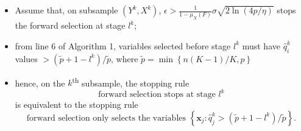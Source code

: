 \documentclass[11pt,review,authoryear]{elsarticle}
\begin{document}
\begin{appendices}
\begin{itemize}
  \item Assume that, on subsample $\left(Y^{k},X^{k}\right)$, $\epsilon>\frac{1}{1-\mu_{X}\left(F\right)}\sigma\sqrt{2\ln\left(4p/\eta\right)}$ stops the forward selection at stage $l^{k}$;
  \item from line 6 of Algorithm 1, variables selected before stage $l^{k}$ must have $\widehat{q}_i^k$ values $> \left(\widetilde{p} + 1 - l^k \right) / \widetilde{p}$, where $\widetilde{p} = \min\left\{ n(K-1)/K, p\right\}$
  \item hence, on the $k$\textsuperscript{th} subsample, the stopping rule
  \begin{displaymath}
    \mbox{forward selection stops at stage } l^k
  \end{displaymath}
  is equivalent to the stopping rule
  \begin{displaymath}
    \mbox{forward selection only selects the variables } \left\{ \mathbf{x}_j:\widehat{q}_j^k>\left(\widetilde{p}+1-l^k\right)/\widetilde{p}\right\}.
  \end{displaymath}
\end{itemize}
\medskip


\end{appendices}
\end{document}

